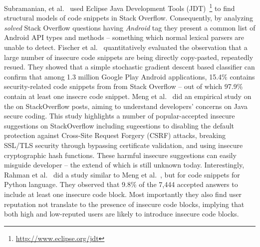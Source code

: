
Subramanian, et al.~\cite{subramanian2013making} used Eclipse Java Development Tools (JDT)~\footnote{\url{http://www.eclipse.org/jdt}}  to find structural models of code snippets in Stack Overflow. Consequently, by analyzing \textit{solved} Stack Overflow questions having \textit{Android} tag they present a common list of Android API types and methods -- something which normal lexical parsers are unable to detect. Fischer et al.~\cite{fischer2017stack}  quantitatively evaluated the observation that a large number of insecure code snippets are being directly copy-pasted, repeatedly resued. They showed that a simple stochastic gradient descent based classifier can confirm that among 1.3 million Google Play Android applications, 15.4\% contains security-related code snippets from  from Stack Overflow -- out of which 97.9\% contain at least one insecre code snippet. Meng et al.~\cite{meng2018secure} did an empirical study on the on StackOverflow posts, aiming to understand developers’ concerns on Java secure coding. This study highlights a number of popular-accepted insecure suggestions on  StackOverflow including sugeestions to disabling the default protection against Cross-Site Request Forgery (CSRF) attacks, breaking SSL/TLS security through bypassing certificate validation, and using insecure cryptographic hash functions. These harmful insecure suggestions can easily misguide developer -- the extend of which is still unknown today. Interestingly, Rahman et al.~\cite{akondsnakes} did a study similar to Meng et al.~\cite{meng2018secure}, but for code snippets for Python language. They observed that 9.8\% of the 7,444 accepted answers to include at least one insecure code block. Most importantly they also find user reputation not
translate to the presence of insecure code blocks, implying  that both high and low-reputed users are likely to introduce insecure code blocks. 



